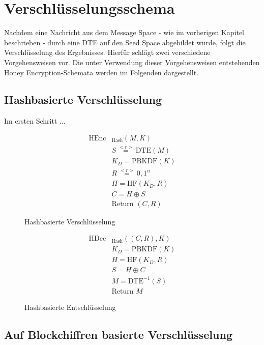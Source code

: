 \section{Verschlüsselungsschema}
\label{sec:schema}

Nachdem eine Nachricht aus dem Message Space - wie im vorherigen Kapitel beschrieben - durch eine DTE auf den Seed Space abgebildet wurde, folgt die Verschlüsselung des Ergebnisses. Hierfür schlägt \cite{EURO2014} zwei verschiedene Vorgehensweisen vor. Die unter Verwendung dieser Vorgehensweisen entstehenden Honey Encryption-Schemata werden im Folgenden dargestellt.

\subsection{Hashbasierte Verschlüsselung}

Im ersten Schritt ...

\begin{figure}[h!]
	\begin{align*}
		\text{HEnc}&_{\text{Hash}}(M, K)\\
		&S \overset{<r>}{=} \text{DTE}(M)\\ 	%
		&K_D = \text{PBKDF}(K)\\ 		%
		&R \overset{<r>}{=} {0,1}^n\\	%
		&H = \text{HF}(K_D,R)\\	%
		&C = H \oplus S\\	%
		&\text{Return } (C,R)
	\end{align*}
	\caption{Hashbasierte Verschlüsselung}
	\label{fig:HashEnc}
\end{figure}

\begin{figure}[h!]
	\begin{align*}
		\text{HDec}&_{\text{Hash}}((C,R), K)\\
		&K_D = \text{PBKDF}(K)\\ 		%
		&H = \text{HF}(K_D,R)\\	%
		&S = H \oplus C\\	%
		&M = \text{DTE}^{-1}(S)\\ 	%
		&\text{Return } M
	\end{align*}
	\caption{Hashbasierte Entschlüsselung}
	\label{fig:HashDec}
\end{figure}

\subsection{Auf Blockchiffren basierte Verschlüsselung}

